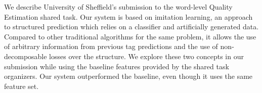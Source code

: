 We describe University of Sheffield's submission to the word-level Quality Estimation shared task. Our system is based on imitation learning, an approach to structured prediction which relies on a classifier and artificially generated data. Compared to other traditional algorithms for the same problem, it allows the use of arbitrary information from previous tag predictions and the use of non-decomposable losses over the structure. We explore these two concepts in our submission while using the baseline features provided by the shared task organizers. Our system outperformed the baseline, even though it uses the same feature set.
